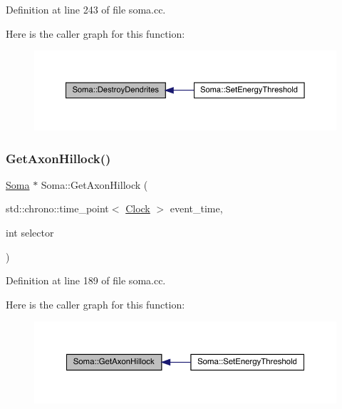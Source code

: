 Definition at line 243 of file soma.\+cc.

Here is the caller graph for this function\+:
\nopagebreak
\begin{figure}[H]
\begin{center}
\leavevmode
\includegraphics[width=350pt]{class_soma_ac549a7caf885fdc0ac3a6adf393430af_icgraph}
\end{center}
\end{figure}
\mbox{\label{class_soma_ac8756f68dbaac8c70cfba435f7068a85}} 
\subsubsection{\texorpdfstring{Get\+Axon\+Hillock()}{GetAxonHillock()}}
{\footnotesize\ttfamily \hyperlink{class_soma}{Soma} $\ast$ Soma\+::\+Get\+Axon\+Hillock (\begin{DoxyParamCaption}\item[{std\+::chrono\+::time\+\_\+point$<$ \hyperlink{universe_8h_a0ef8d951d1ca5ab3cfaf7ab4c7a6fd80}{Clock} $>$}]{event\+\_\+time,  }\item[{int}]{selector }\end{DoxyParamCaption})}



Definition at line 189 of file soma.\+cc.

Here is the caller graph for this function\+:
\nopagebreak
\begin{figure}[H]
\begin{center}
\leavevmode
\includegraphics[width=350pt]{class_soma_ac8756f68dbaac8c70cfba435f7068a85_icgraph}
\end{center}
\end{figure}
\mbox{\label{class_soma_a23dc309849522d9f857fdcc71ea85877}} 
